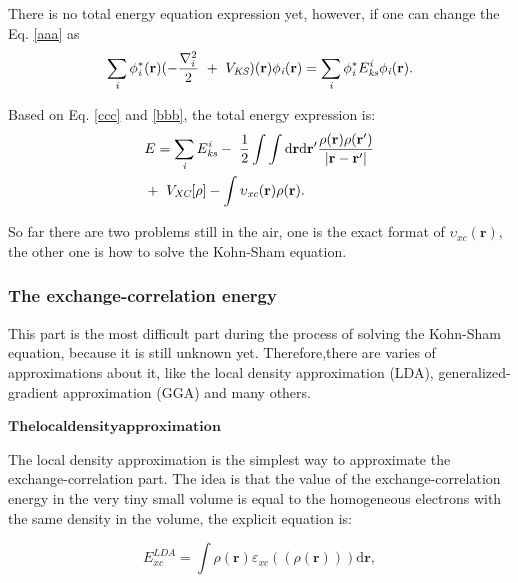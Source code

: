 \documentclass[a4paper, 12pt, titlepage,oneside,drop]{kthesis}
\begin{document}
There is no total energy equation expression yet, however, if one can change the Eq. \ref{aaa} as 
\begin{equation}\label{bbb}
\sumi<i> \phi^{*}_{\textit{i}}(\textbf{r})(-\frac{\nabla^{2}_{i}}{2}\ + \ V_\textit{KS})(\textbf{r}) \phi_{\textit{i}}(\textbf{r}) = \sumi<i> \phi^{*}_{\textit{i}}E_{\textit{ks}}^{\textit{i}} \phi_{\textit{i}}(\textbf{r}).
\end{equation}

Based on Eq. \ref{ccc} and \ref{bbb}, the total energy expression is:
\begin{equation}\label{totalenergy}
\begin{split}
& E= \sumi<i> E_{\textit{ks}}^{\textit{i}} - \ \frac{1}{2} \int \int \mathrm{d} {\textbf{r}} \mathrm{d}{\textbf{r}^{\prime}} \frac{\rho({\textbf{r}})\rho(\textbf{r}^{\prime})}{|{\textbf{r}}-{\textbf{r}}^{\prime}|} \\
&    + \ V_\textit{XC}[\rho] - \int   \upsilon_\textit{xc}(\textbf{r}) \rho({\textbf{r}}).
\end{split}
\end{equation}

So far there are two problems still in the air, one is the exact format of $\upsilon_\textit{xc}(\textbf{r})$, the other one is how to solve the Kohn-Sham equation.

\subsubsection{The exchange-correlation energy}

This part is the most difficult part during the process of solving the Kohn-Sham equation, because it is still unknown yet. Therefore,there
 are varies of approximations about it, like the local density approximation (LDA), generalized-gradient approximation (GGA) and many others.

$\mathbf{The local density approximation}$

The local density approximation is the simplest way to approximate the exchange-correlation part. The idea is that the value 
of the exchange-correlation energy in the very tiny small volume is equal to the homogeneous electrons with the same density in 
the volume, the explicit equation is: 

\begin{equation}
 E^\textit{LDA}_\textit{xc} = \int \rho(\textbf{r}) \varepsilon_\textit{xc}( (\rho(\textbf{r})) ) \mathrm{d} \textbf{r}, 
\end{equation}
\end{document}
